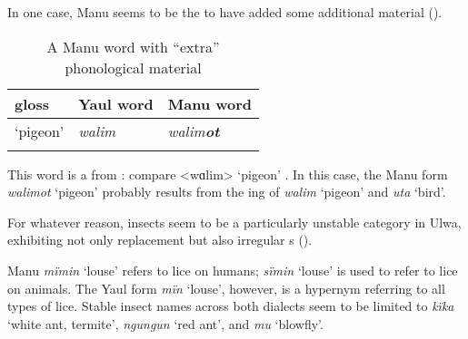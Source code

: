   In one case, Manu seems to be the  to have added some additional  material ().


\begin{table}
\caption{A Manu word with “extra” phonological material}
\label{tab:18.24}


\begin{tabular}{lll}

\lsptoprule

gloss & Yaul word & Manu word\\
\midrule
‘pigeon’ & {\itshape walim} & {\itshape walim\textbf{ot}}\\
\lspbottomrule
\end{tabular}
\end{table}
This word is a  from : compare  <wɑlim> ‘pigeon’ \linebreak \citep[3192]{Laycock1971a}. In this case, the Manu form \textit{walimot} ‘pigeon’ probably results from the ing of \textit{walim} ‘pigeon’ and \textit{uta} ‘bird’.

  For whatever reason, insects seem to be a particularly unstable  category in Ulwa, exhibiting not only  replacement but also irregular s ().

Manu \textit{mïmin} ‘louse’ refers to lice on humans; \textit{sïmin} ‘louse’ is used to refer to lice on animals. The Yaul form \textit{mïn} ‘louse’, however, is a hypernym referring to all types of lice. Stable insect names across both dialects seem to be limited to \textit{kïka} ‘white ant, termite’, \textit{ngungun} ‘red ant’, and \textit{mu} ‘blowfly’.


